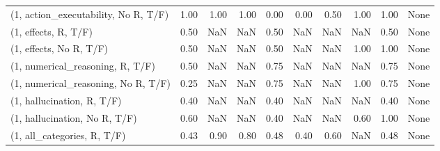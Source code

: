 \begin{table*}[h!]
\begin{adjustbox}{width=2\columnwidth,center}
\begin{tabular}{lrrr|rrr|rrr}
(1, action\_executability, No R, T/F) &                      1.00 &                  1.00 &                      1.00 &                          0.00 &                      0.00 &                          0.50 &                                   1.00 &                               1.00 &                                  None \\
(1, effects, R, T/F)                 &                      0.50 &                   NaN &                       NaN &                          0.50 &                       NaN &                           NaN &                                    NaN &                               0.50 &                                  None \\
(1, effects, No R, T/F)              &                      0.50 &                   NaN &                       NaN &                          0.50 &                       NaN &                           NaN &                                   1.00 &                               1.00 &                                  None \\
(1, numerical\_reasoning, R, T/F)     &                      0.50 &                   NaN &                       NaN &                          0.75 &                       NaN &                           NaN &                                    NaN &                               0.75 &                                  None \\
(1, numerical\_reasoning, No R, T/F)  &                      0.25 &                   NaN &                       NaN &                          0.75 &                       NaN &                           NaN &                                   1.00 &                               0.75 &                                  None \\
(1, hallucination, R, T/F)           &                      0.40 &                   NaN &                       NaN &                          0.40 &                       NaN &                           NaN &                                    NaN &                               0.40 &                                  None \\
(1, hallucination, No R, T/F)        &                      0.60 &                   NaN &                       NaN &                          0.40 &                       NaN &                           NaN &                                   0.60 &                               1.00 &                                  None \\
(1, all\_categories, R, T/F)          &                      0.43 &                  0.90 &                      0.80 &                          0.48 &                      0.40 &                          0.60 &                                    NaN &                               0.48 &                                  None \\

\end{tabular}
\end{adjustbox}
\end{table*}
